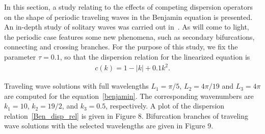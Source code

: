 
In this section, a study relating to the effects of competing dispersion operators 
on the shape of periodic traveling waves in the Benjamin equation is presented.
An in-depth study of solitary waves was carried out in~\cite{Dougalis2015}.
As will come to light, the periodic case features some new phenomena, such as secondary
bifurcations, connecting and crossing branches.
For the purpose of this study, we fix the parameter $\tau=0.1$,
so that the dispersion relation for the linearized equation is
\begin{align}
c(k) = 1 - |k| +  0.1  k^2. 	\label{Ben_disp_rel}
\end{align}

	
Traveling wave solutions with full wavelengths $L_1 = \pi/5$, $L_2 = 4\pi /19$ and $L_3 = 4\pi$ 
are computed for the equation~\eqref{benjamin}.  
The corresponding wavenumbers are $k_1 = 10$, $k_2 = 19/2$, and $k_3 = 0.5$, respectively.
A plot of the dispersion relation~\eqref{Ben_disp_rel} is given in Figure 8.
Bifurcation branches of traveling wave solutions with the selected wavelengths are given in Figure 9.

	
		
%
 

 	
 	 



